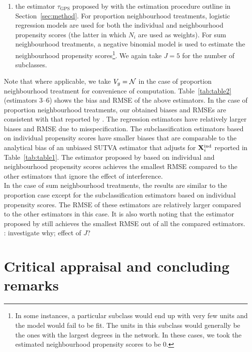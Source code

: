 \documentclass[10pt]{article}
\begin{document}
\begin{enumerate}
\item
the estimator $\tau_\text{GPS}$ proposed by \textcite{Forastiere:2021} with the estimation procedure outline in Section~\ref{sec:method}. For proportion neighbourhood treatments, logistic regression models are used for both the individual and neighbourhood propensity scores (the latter in which $N_i$ are used as weights). For sum neighbourhood treatments, a negative binomial model is used to estimate the neighbourhood propensity scores\footnote{In some instances, a particular subclass would end up with very few units and the model would fail to be fit. The units in this subclass would generally be the ones with the largest degrees in the network. In these cases, we took the estimated neighbourhood propensity scores to be 0.}. We again take $J=5$ for the number of subclasses.

\end{enumerate}
Note that where applicable, we take $V_g=\mathcal{N}$ in the case of proportion neighbourhood treatment for convenience of computation. Table~\ref{tab:table2} (estimators 3--6) shows the bias and RMSE of the above estimators. In the case of proportion neighbourhood treatments, our obtained biases and RMSEs are consistent with that reported by \textcite{Forastiere:2021}. The regression estimators have relatively larger biases and RMSE due to misspecification. The subclassification estimators based on individual propensity scores have smaller biases that are comparable to the analytical bias of an unbiased SUTVA estimator that adjusts for $\mathbf{X}^{\text{ind}}_i$ reported in Table~\ref{tab:table1}. The estimator proposed by \citeauthor{Forastiere:2021} based on individual and neighbourhood propensity scores achieves the smallest RMSE compared to the other estimators that ignore the effect of interference.
\\

In the case of sum neighbourhood treatments, the results are similar to the proportion case except for the subclassification estimators based on individual propensity scores. The RMSE of these estimators are relatively larger compared to the other estimators in this case. It is also worth noting that the estimator proposed by \citeauthor{Forastiere:2021} still achieves the smallest RMSE out of all the compared estimators.
\\

\todo: investigate why; effect of $J$?



\section{Critical appraisal and concluding remarks} \label{sec:critique}
\end{document}
